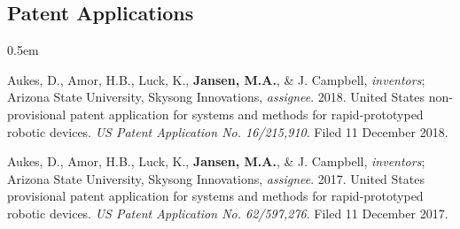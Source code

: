 \documentclass[12pt,a4paper]{article}
\begin{document}
\subsection*{Patent Applications}
\begin{description}
	\itemsep0.5em
	\item Aukes, D., Amor, H.B., Luck, K., \textbf{Jansen, M.A.}, \& J. Campbell, \textit{inventors}; Arizona State University, Skysong Innovations, \textit{assignee}. 2018. United States non-provisional patent application for systems and methods for rapid-prototyped robotic devices. \textit{US Patent Application No. 16/215,910}. Filed 11 December 2018.
	
	\item Aukes, D., Amor, H.B., Luck, K., \textbf{Jansen, M.A.}, \& J. Campbell, \textit{inventors}; Arizona State University, Skysong Innovations, \textit{assignee}. 2017. United States provisional patent application for systems and methods for rapid-prototyped robotic devices. \textit{US Patent Application No. 62/597,276}. Filed 11 December 2017.
\end{description}
\end{document}
